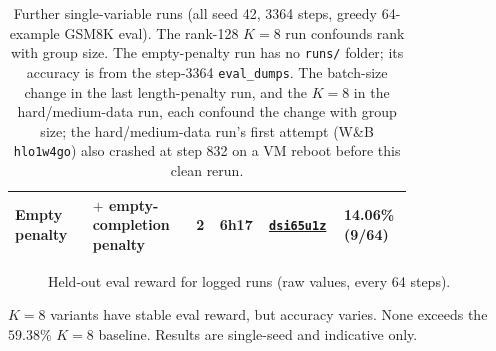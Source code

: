 \begin{table}[htbp]
\begin{tabular}{@{}L{0.18\linewidth}L{0.24\linewidth}L{0.04\linewidth}L{0.07\linewidth}L{0.11\linewidth}L{0.15\linewidth}@{}}
Empty penalty  & $+$ empty-completion penalty                 & 2 & 6h17 & \href{https://wandb.ai/felsomoye-university-of-cambridge/tunix/runs/dsi65ulz}{\texttt{dsi65u1z}}                                                                              & 14.06\% (9/64) \\
\bottomrule
\end{tabular}
\caption{Further single-variable runs (all seed 42, 3364 steps, greedy 64-example GSM8K eval).
The rank-128 $K{=}8$ run confounds rank with group size. The empty-penalty run has no \texttt{runs/}
folder; its accuracy is from the step-3364 \texttt{eval\_dumps}. The batch-size
change in the last length-penalty run, and the $K{=}8$ in the hard/medium-data run, each confound
the change with group size; the hard/medium-data run's first attempt (W\&B \texttt{hlo1w4go}) also
crashed at step 832 on a VM reboot before this clean rerun.}
\label{tab:other-runs}
\end{table}

\begin{figure}[htbp]
\caption{Held-out eval reward for logged runs (raw values, every 64 steps).}
\label{fig:other-runs-eval-reward}
\end{figure}

\noindent
$K=8$ variants have stable eval reward, but accuracy varies. None exceeds the $59.38\%$
$K=8$ baseline. Results are single-seed and indicative only.
